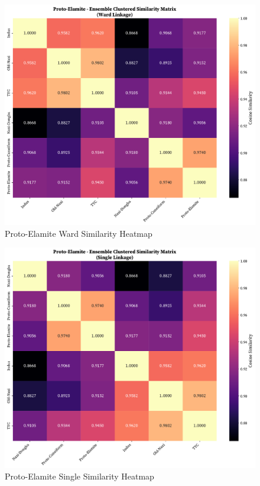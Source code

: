 \documentclass[11pt,a4paper,oneside]{report}
\begin{document}
\begin{figure}[H]
    \centering
    \includegraphics[width=0.75\linewidth]{Visualizations/Clustered Heatmaps/Proto-Elamite/ensemble_clustered_similarity_ward.pdf}
     \caption*{Proto-Elamite Ward Similarity Heatmap}
\end{figure}
 \begin{figure}[H]
    \centering
    \includegraphics[width=0.75\linewidth]{Visualizations/Clustered Heatmaps/Proto-Elamite/ensemble_clustered_similarity_single.pdf}
     \caption*{Proto-Elamite Single Similarity Heatmap}
\end{figure}
\end{document}
